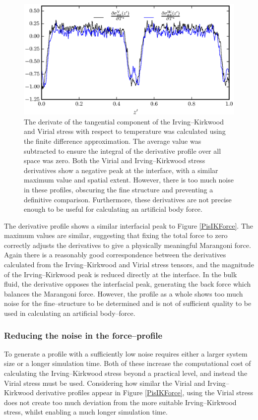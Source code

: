 \begin{figure}[h]
\centering
\includegraphics[scale=1.0]{Period10Force}
\caption{The derivate of the tangential component of the Irving--Kirkwood and Virial stress with respect to temperature was calculated using the finite difference approximation.
The average value was subtracted to ensure the integral of the derivative profile over all space was zero.
Both the Virial and Irving--Kirkwood stress derivatives show a negative peak at the interface, with a similar maximum value and spatial extent.
However, there is too much noise in these profiles, obscuring the fine structure and preventing a definitive comparison.
Furthermore, these derivatives are not precise enough to be useful for calculating an artificial body force.
}
\label{Period10Force}
\end{figure}
The derivative profile shows a similar interfacial peak to Figure \ref{PisIKForce}. 
The maximum values are similar, suggesting that fixing the total force to zero correctly adjusts the derivatives to give a physically meaningful Marangoni force.
Again there is a reasonably good correspondence between the derivatives calculated from the Irving--Kirkwood and Virial stress tensors, and the magnitude of the Irving--Kirkwood peak is reduced directly at the interface.
In the bulk fluid, the derivative opposes the interfacial peak, generating the back force which balances the Marangoni force.
However, the profile as a whole shows too much noise for the fine--structure to be determined and is not of sufficient quality to be used in calculating an artificial body--force.

\subsubsection{Reducing the noise in the force--profile}
To generate a profile with a sufficiently low noise requires either a larger system size or a longer simulation time.
Both of these increase the computational cost of calculating the Irving--Kirkwood stress beyond a practical level, and instead the Virial stress must be used.
Considering how similar the Virial and Irving--Kirkwood derivative profiles appear in Figure \ref{PisIKForce}, using the Virial stress does not create too much deviation from the more suitable Irving--Kirkwood stress, whilst enabling a much longer simulation time.
\FloatBarrier

